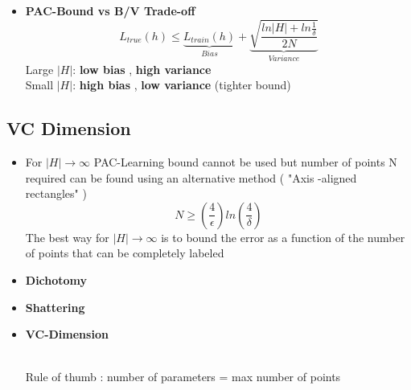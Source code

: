 \documentclass[12pt]{article} %
\begin{document}
\begin{itemize}
\item \textbf{PAC-Bound vs B/V Trade-off}
$$ L_{true}(h) \leq \underbrace{L_{train}(h)}_{Bias} + \underbrace{\sqrt{\frac{ln|H|+ ln \frac{1}{\delta}}{2N}}}_{Variance}$$
Large $|H|$: \textbf{low bias} , \textbf{high variance}\\
Small $|H| $: \textbf{high bias} , \textbf{low variance} (tighter bound)
\end{itemize}

\subsection{VC Dimension}
\begin{itemize}
\item For $|H| \rightarrow \infty$ PAC-Learning bound cannot be used but number of points N required can be found using an alternative method ( "Axis -aligned rectangles" ) $$ N \geq \left( \frac{4}{\epsilon} \right) ln \left( \frac{4}{\delta} \right)$$
The best way for $|H| \rightarrow \infty$ is to bound the error as a function of the number of points that can be completely labeled

\item \textbf{Dichotomy}
\begin{center}
\end{center}

\item \textbf{Shattering}
\begin{center}
\end{center}

\item \textbf{VC-Dimension}
\begin{center}
\\
Rule of thumb : number of parameters = max number of points
\end{center}


\end{itemize}
\end{document}
